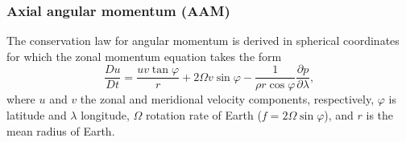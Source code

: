 \documentclass{agujournal}
\begin{document}
\subsubsection{Axial angular momentum (AAM)}
The conservation law for angular momentum is derived in spherical coordinates for which the zonal momentum equation takes the form
\begin{equation}
\frac{Du}{Dt}=\frac{u v \tan \varphi}{r}+2\Omega v\sin \varphi -\frac{1}{\rho r \cos \varphi}\frac{\partial p}{\partial \lambda},\label{eq:tmp200}
\end{equation}
where $u$ and $v$ the zonal and meridional velocity components, respectively, $\varphi$ is latitude and $\lambda$ longitude, $\Omega$ rotation rate of Earth ($f=2\Omega \sin \varphi$), and $r$ is the mean radius of Earth.\\
\end{document}
